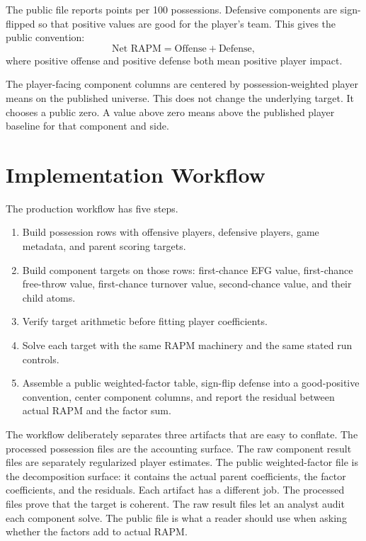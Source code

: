 \documentclass[11pt]{article}
\begin{document}
The public file reports points per 100 possessions.  Defensive components are
sign-flipped so that positive values are good for the player's team.  This
gives the public convention:
\[
\text{Net RAPM} = \text{Offense} + \text{Defense},
\]
where positive offense and positive defense both mean positive player impact.

The player-facing component columns are centered by possession-weighted player
means on the published universe.  This does not change the underlying target.
It chooses a public zero.  A value above zero means above the published player
baseline for that component and side.

\section{Implementation Workflow}

The production workflow has five steps.

\begin{enumerate}[leftmargin=*]
\item Build possession rows with offensive players, defensive players, game
metadata, and parent scoring targets.
\item Build component targets on those rows: first-chance EFG value,
first-chance free-throw value, first-chance turnover value, second-chance value,
and their child atoms.
\item Verify target arithmetic before fitting player coefficients.
\item Solve each target with the same RAPM machinery and the same stated run
controls.
\item Assemble a public weighted-factor table, sign-flip defense into a
good-positive convention, center component columns, and report the residual
between actual RAPM and the factor sum.
\end{enumerate}

The workflow deliberately separates three artifacts that are easy to conflate.
The processed possession files are the accounting surface.  The raw component
result files are separately regularized player estimates.  The public
weighted-factor file is the decomposition surface: it contains the actual
parent coefficients, the factor coefficients, and the residuals.  Each artifact
has a different job.  The processed files prove that the target is coherent.
The raw result files let an analyst audit each component solve.  The public file
is what a reader should use when asking whether the factors add to actual RAPM.
\end{document}
